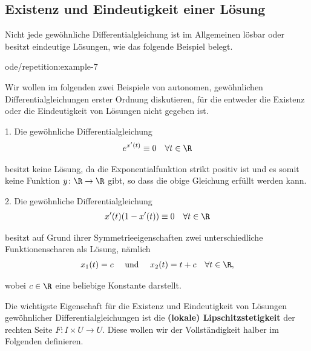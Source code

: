\documentclass[letterpaper,10pt,german]{jupyterBook}
\begin{document}
\subsection{Existenz und Eindeutigkeit einer Lösung}
\label{\detokenize{ode/repetition:existenz-und-eindeutigkeit-einer-losung}}
\par
Nicht jede gewöhnliche Differentialgleichung ist im Allgemeinen lösbar oder besitzt eindeutige Lösungen, wie das folgende Beispiel belegt.
\begin{example}{}{ode/repetition:example-7}



\par
Wir wollen im folgenden zwei Beispiele von autonomen, gewöhnlichen Differentialgleichungen erster Ordnung diskutieren, für die entweder die Existenz oder die Eindeutigkeit von Lösungen nicht gegeben ist.

\par
1. Die gewöhnliche Differentialgleichung
\begin{align*}
e^{x'(t)} \equiv 0 \quad \forall t \in \R
\end{align*}
\par
besitzt keine Lösung, da die Exponentialfunktion strikt positiv ist und es somit keine Funktion \(y \colon \R \rightarrow \R\) gibt, so dass die obige Gleichung erfüllt werden kann.

\par
2. Die gewöhnliche Differentialgleichung
\begin{align*}
x'(t)(1-x'(t)) \equiv 0 \quad \forall t \in \R
\end{align*}
\par
besitzt auf Grund ihrer Symmetrieeigenschaften zwei unterschiedliche Funktionenscharen als Lösung, nämlich
\begin{align*}
x_1(t) = c \quad \text{ und } \quad x_2(t) = t + c \quad \forall t \in \R,
\end{align*}
\par
wobei \(c \in \R\) eine beliebige Konstante darstellt.
\end{example}

\par
Die wichtigste Eigenschaft für die Existenz und Eindeutigkeit von Lösungen gewöhnlicher Differentialgleichungen ist die \textbf{(lokale) Lipschitzstetigkeit} der rechten Seite \(F \colon I \times U \rightarrow U\).
Diese wollen wir der Vollständigkeit halber im Folgenden definieren.
\end{document}
